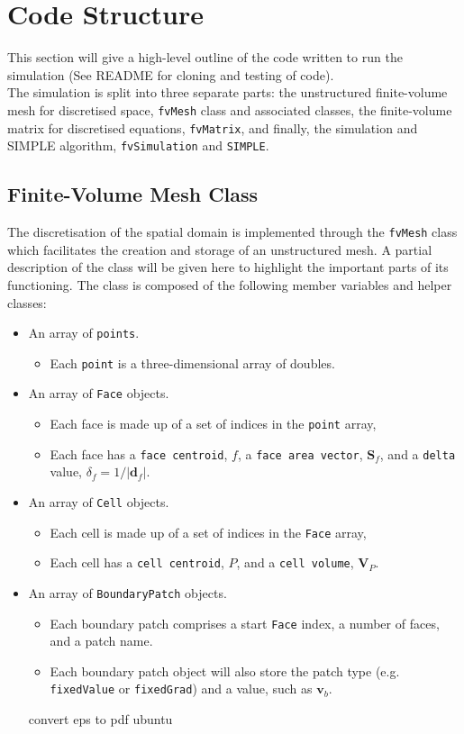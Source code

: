 \documentclass[final,3p,times,twocolumn]{elsarticle}
\begin{document}
\section{Code Structure}
This section will give a high-level outline of the code written to run the simulation (See README for cloning and testing of code). \\ The simulation is split into three separate parts: the unstructured finite-volume mesh for discretised space, \texttt{fvMesh} class and associated classes, the finite-volume matrix for discretised equations, \texttt{fvMatrix}, and finally, the simulation and SIMPLE algorithm, \texttt{fvSimulation} and \texttt{SIMPLE}. 

\subsection{Finite-Volume Mesh Class}
The discretisation of the spatial domain is implemented through the \texttt{fvMesh} class which facilitates the creation and storage of an unstructured mesh. A partial description of the class will be given here to highlight the important parts of its functioning. The class is composed of the following member variables and helper classes:
\begin{itemize}
    \item An array of \texttt{points}.
        \begin{itemize}
            \item Each \texttt{point} is a three-dimensional array of doubles.
        \end{itemize}
    \item An array of \texttt{Face} objects.
        \begin{itemize}
            \item Each face is made up of a set of indices in the \texttt{point} array, 
            \item Each face has a \texttt{face centroid}, $f$, a \texttt{face area vector}, $\mathbf{S}_f$, and a \texttt{delta} value, $\delta_f = 1/|\mathbf{d}_f|$. 
        \end{itemize}
    \item An array of \texttt{Cell} objects.
        \begin{itemize}
            \item Each cell is made up of a set of indices in the \texttt{Face} array, 
            \item Each cell has a \texttt{cell centroid}, $P$, and a \texttt{cell volume}, $\mathbf{V}_P$.
        \end{itemize}
    \item An array of \texttt{BoundaryPatch} objects.
        \begin{itemize}
            \item Each boundary patch comprises a start \texttt{Face} index, a number of faces, and a patch name. 
            \item Each boundary patch object will also store the patch type (e.g. \texttt{fixedValue} or \texttt{fixedGrad}) and a value, such as $\mathbf{v}_b$.
        \end{itemize}convert eps to pdf ubuntu
\end{itemize}
\end{document}
